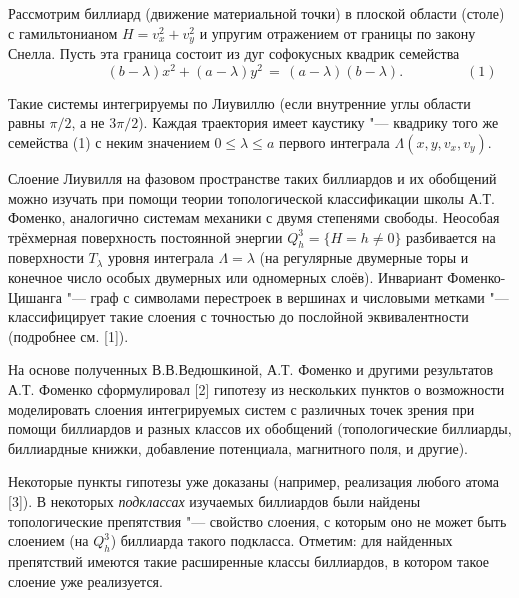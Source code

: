 \vzmstitle[[\footnote{Работа выполнена при поддержке Программы Президента РФ поддержки ведущих научных школ (грант НШ-6399.2018.1, соглашение № 075-02-2018-867)}]{Интегрируемые биллиардны реализуют любой класс Эйлера многообразий Зейферта}
\vzmscaption


Рассмотрим биллиард (движение материальной точки) в плоской области (столе) с гамильтонианом $H = v_x^2 + v_y^2$ и упругим отражением от границы по закону Снелла. Пусть эта граница состоит из дуг софокусных квадрик семейства
\[ \qquad \qquad \qquad (b - \lambda) x^2 + (a - \lambda) y^2 \, = \, (a - \lambda) (b - \lambda). \qquad\qquad \,\,\, (1)\]

Такие системы интегрируемы по Лиувиллю (если внутренние углы области равны $\pi\slash 2$, а не $3\pi\slash 2$). Каждая траектория имеет каустику "--- квадрику того же семейства (1) с неким значением $0 \le \lambda \le a$ первого интеграла $\Lambda(x, y, v_x, v_y)$.

Слоение Лиувилля на фазовом пространстве таких биллиардов и их обобщений можно изучать при помощи теории топологической классификации школы А.Т. Фоменко, аналогично системам механики с двумя степенями свободы. Неособая трёхмерная поверхность постоянной энергии $Q^3_h = \{H = h \ne 0\}$ разбивается на поверхности $T_\lambda$ уровня интеграла $\Lambda = \lambda$ (на регулярные двумерные торы и конечное число особых двумерных или одномерных слоёв). Инвариант Фоменко-Цишанга "--- граф с символами перестроек в вершинах и числовыми метками "--- классифицирует такие слоения с точностью до послойной эквивалентности (подробнее см. [1]).

На основе полученных В.В.Ведюшкиной, А.Т. Фоменко и другими результатов А.Т. Фоменко сформулировал [2] гипотезу из нескольких пунктов о возможности моделировать слоения интегрируемых систем с различных точек зрения при помощи биллиардов и разных классов их обобщений (топологические биллиарды, биллиардные книжки, добавление потенциала, магнитного поля, и другие).

Некоторые пункты гипотезы уже доказаны (например, реализация любого атома [3]). В некоторых \textit{подклассах} изучаемых биллиардов были найдены топологические препятствия "--- свойство слоения, с которым оно не может быть слоением (на $Q^3_h$) биллиарда такого подкласса. Отметим: для найденных препятствий имеются такие расширенные классы биллиардов, в котором такое слоение уже реализуется.

